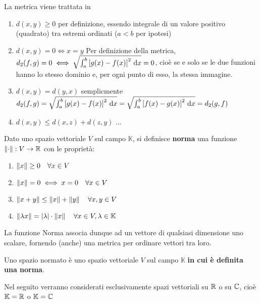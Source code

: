 \begin{example}
\begin{enumerate}
		\label{ex:dim_dist_quadratica}
			\begin{note}
				La metrica viene trattata in 
			\end{note}
			\begin{enumerate}[label=\arabic*.]
				\item $d(x,y) \geq 0$ per definizione, essendo integrale di un valore positivo (quadrato) tra estremi ordinati ($a<b$ per ipotesi)
				\item $d(x,y) = 0 \iff x = y$ Per definizione della metrica, $d_2(f,g) = 0 \iff \sqrt{\int_a^b\left[g(x)-f(x)\right]^2 \,\mathrm{d}{x}} = 0$, cioè se e solo se le due funzioni hanno lo stesso dominio e, per ogni punto di esso, la stessa immagine.
				\item $d(x,y)=d(y,x)$ semplicmente $d_2(f,g) = \sqrt{\int_a^b\left[g(x)-f(x)\right]^2 \,\mathrm{d}{x}} = \sqrt{\int_a^b\left[f(x)-g(x)\right]^2 \,\mathrm{d}{x}} = d_2(g,f)$
				\item $d(x,y) \leq d(x,z) + d(z,y)$ ... %
			\end{enumerate}
	\end{enumerate}
\end{example}

\begin{definition}[Norma]
	\label{def:norma}
	Dato uno spazio vettoriale $V$ sul campo $\mathbb{K}$, si definisce \textbf{norma} una funzione $\left\|\cdot\right\|:V \to \mathbb{R}$ con le proprietà:
	\begin{enumerate}
		\item $\left\|x\right\| \geq 0 \quad \forall x\in V$
		\item $\left\|x\right\|=0 \iff x = 0 \quad \forall x\in V$
		\item $\left\|x+y\right\| \leq \left\|x\right\|+\left\|y\right\| \quad \forall x,y\in V$
		\item \label{itm:norm_lambda} $\left\|\lambda x\right\| = \left|\lambda\right| \cdot \left\|x\right\| \quad \forall x\in V,\lambda\in\mathbb{K}$
	\end{enumerate}
	\begin{note}
		La funzione Norma associa dunque ad un vettore di qualsiasi dimensione uno scalare, fornendo (anche) una metrica per ordinare vettori tra loro.
	\end{note}
\end{definition}
\begin{definition}
	Uno spazio normato è uno spazio vettoriale $V$ sul campo $\mathbb{K}$ \textbf{in cui è definita una norma}.
	\begin{note}
		Nel seguito verranno considerati esclusivamente spazi vettoriali su $\mathbb{R}$ o su $\mathbb{C}$, cioè $\mathbb{K} = \mathbb{R}$ o $\mathbb{K} = \mathbb{C}$
	\end{note}
\end{definition}

